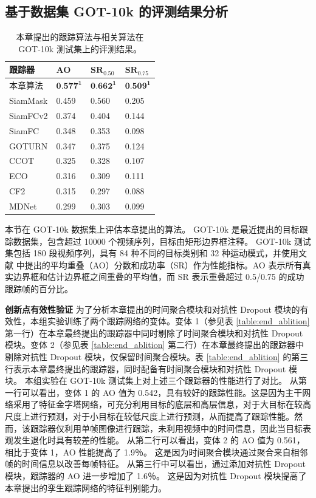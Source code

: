 \subsection{基于数据集 GOT-10k 的评测结果分析}
\begin{table}[t]
\centering
\caption{本章提出的跟踪算法与相关算法在 GOT-10k \cite{GOT-10k} 测试集上的评测结果。}
\begin{tabular}{l l l l}
\bottomrule
跟踪器   &  AO   &  $\textbf{SR}_{0.50}$ & $\textbf{SR}_{0.75}$  \\
\hline
本章算法 &  $\textbf{0.577}^\textbf{1}$ & $\textbf{0.662}^\textbf{1}$  & $\textbf{0.509}^\textbf{1}$  \\
SiamMask \cite{Wang2018SiamMask} &  0.459&  0.560 &0.205 \\
SiamFCv2 \cite{valmadre2017end} &  0.374&  0.404 &0.144 \\
SiamFC \cite{SiamFC}  &  0.348&  0.353 &0.098 \\
GOTURN \cite{GOTURN} &  0.347&  0.375 &0.124 \\
CCOT	 \cite{danelljan2016beyond} &  0.325&  0.328 &0.107 \\
ECO \cite{danelljan2017eco} &  0.316&  0.309 &0.111 \\
CF2 \cite{CF2} &  0.315&  0.297 &0.088 \\
MDNet \cite{MDNet} &  0.299&  0.303 &0.099 \\
\bottomrule
\end{tabular}
\label{table:end_got10k}
\end{table}
本节在 GOT-10k \cite{GOT-10k} 数据集上评估本章提出的算法。
GOT-10k 是最近提出的目标跟踪数据集，包含超过 10000 个视频序列，目标由矩形边界框注释。
GOT-10k 测试集包括 180 段视频序列，具有 84 种不同的目标类别和 32 种运动模式，并使用文献 \cite{GOT-10k} 中提出的平均重叠（AO）分数和成功率（SR）作为性能指标。AO 表示所有真实边界框和估计边界框之间重叠的平均值，而 SR 表示重叠超过 0.5/0.75 的成功跟踪帧的百分比。

\textbf{创新点有效性验证}
为了分析本章提出的时间聚合模块和对抗性 Dropout 模块的有效性，本组实验训练了两个跟踪网络的变体。变体 1（参见表 \ref{table:end_ablition} 第一行）在本章最终提出的跟踪器中同时剔除了时间聚合模块和对抗性 Dropout 模块。变体 2（参见表 \ref{table:end_ablition} 第二行）在本章最终提出的跟踪器中剔除对抗性 Dropout 模块，仅保留时间聚合模块。表 \ref{table:end_ablition} 的第三行表示本章最终提出的跟踪器，同时配备有时间聚合模块和对抗性 Dropout 模块。
本组实验在 GOT-10k 测试集上对上述三个跟踪器的性能进行了对比。
从第一行可以看出，变体 1 的 AO 值为 0.542，具有较好的跟踪性能。这是因为主干网络采用了特征金字塔网络，可充分利用目标的底层和高层信息，对于大目标在较高尺度上进行预测，对于小目标在较低尺度上进行预测，从而提高了跟踪性能。然而，该跟踪器仅利用单帧图像进行跟踪，未利用视频中的时间信息，因此当目标表观发生退化时具有较差的性能。
从第二行可以看出，变体 2 的 AO 值为 0.561，相比于变体 1，AO 性能提高了 1.9％。
这是因为时间聚合模块通过聚合来自相邻帧的时间信息以改善每帧特征。
从第三行中可以看出，通过添加对抗性 Dropout 模块，跟踪器的 AO 进一步增加了 1.6％。
这是因为对抗性 Dropout 模块提高了本章提出的孪生跟踪网络的特征判别能力。

